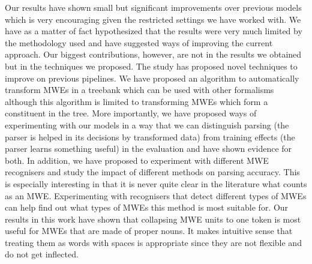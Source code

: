 \documentclass[output=paper]{langsci/langscibook}
\begin{document}
\indent Our results have shown small but significant improvements over previous models which is very encouraging given the restricted settings we have worked with. We have as a matter of fact hypothesized that the results were very much limited by the methodology used and have suggested ways of improving the current approach. Our biggest contributions, however, are not in the results we obtained but in the techniques we proposed. The study has proposed novel techniques to improve on previous pipelines. We have proposed an algorithm to automatically transform MWEs in a treebank which can be used with other formalisms although this algorithm is limited to transforming MWEs which form a constituent in the tree. More importantly, we have proposed ways of experimenting with our models in a way that we can distinguish parsing (the parser is helped in its decisions by transformed data) from training effects (the parser learns something useful) in the evaluation and have shown evidence for both. In addition, we have proposed to experiment with different MWE recognisers and study the impact of different  methods on parsing accuracy. This is especially interesting in that it is never quite clear in the literature what counts as an MWE. Experimenting with recognisers that detect different types of MWEs can help find out what types of MWEs this method is most suitable for. Our results in this work have shown that collapsing MWE units to one token is most useful for MWEs that are made of proper nouns. It makes intuitive sense that treating them as words with spaces is appropriate since they are not flexible and do not get inflected.
\end{document}
